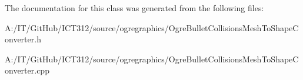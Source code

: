 The documentation for this class was generated from the following files\-:\begin{DoxyCompactItemize}
\item 
A\-:/\-I\-T/\-Git\-Hub/\-I\-C\-T312/source/ogregraphics/Ogre\-Bullet\-Collisions\-Mesh\-To\-Shape\-Converter.\-h\item 
A\-:/\-I\-T/\-Git\-Hub/\-I\-C\-T312/source/ogregraphics/Ogre\-Bullet\-Collisions\-Mesh\-To\-Shape\-Converter.\-cpp\end{DoxyCompactItemize}
